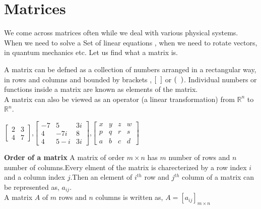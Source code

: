 \chapter{Matrices}
We  come  across  matrices often while  we  deal  with various physical systems. When we need to solve  a  Set  of  linear  equations  ,  when  we  need  to  rotate  vectors, in quantum mechanics etc. Let us find what a matrix is.
\begin{definition}
A matrix can be defned as a collection of numbers arranged in a rectangular way, in rows and columns and bounded by brackets , $[\hspace{0.2cm} ]$  or  $(\hspace{0.2cm})$. Individual numbers or functions inside a matrix  are known as elements of the matrix.\\ A matrix can also be viewed as an operator (a linear transformation) from $\mathbb{R}^{n}$ to $\mathbb{R}^{n}$.	
\end{definition}
\begin{example}
$\left[\begin{array}{ll}2 & 3 \\ 4 & 7\end{array}\right]$,$\left[\begin{array}{lll}-7 & 5 &3i\\ 4 & -7i&8\\4 & 5-i &3i \end{array}\right]$,$\left[\begin{array}{llll}x & y &z&w\\ p & q&r&s\\a & b &c&d \end{array}\right]$		
\end{example}
\textbf{Order of a matrix}
\newline A matrix of order $m\times n$ has $m$ number of rows and  $n$  number of columns.Every elment of the matrix is charecterized by a row index $i$ and a column index $j$.Then an element of $i^{th}$ row and $j^{th}$ column of a matrix can be represented as, $a_{ij}$.
\\A matrix $A$ of $m$ rows and $n$ columns is written as,
$A=[a_{ij}]_{m\times n}$

